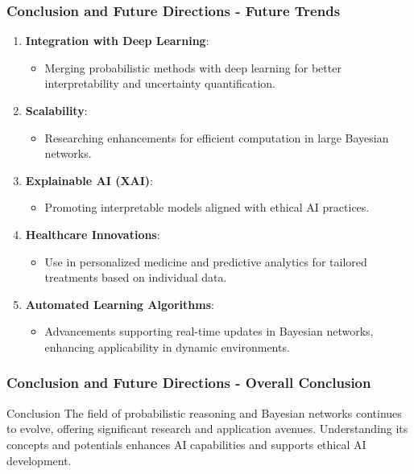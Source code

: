 \documentclass[aspectratio=169]{beamer}
\begin{document}
\begin{frame}[fragile]
  \frametitle{Conclusion and Future Directions - Future Trends}

  \begin{enumerate}
    \item \textbf{Integration with Deep Learning}:
    \begin{itemize}
      \item Merging probabilistic methods with deep learning for better interpretability and uncertainty quantification.
    \end{itemize}

    \item \textbf{Scalability}:
    \begin{itemize}
      \item Researching enhancements for efficient computation in large Bayesian networks.
    \end{itemize}

    \item \textbf{Explainable AI (XAI)}:
    \begin{itemize}
      \item Promoting interpretable models aligned with ethical AI practices.
    \end{itemize}

    \item \textbf{Healthcare Innovations}:
    \begin{itemize}
      \item Use in personalized medicine and predictive analytics for tailored treatments based on individual data.
    \end{itemize}

    \item \textbf{Automated Learning Algorithms}:
    \begin{itemize}
      \item Advancements supporting real-time updates in Bayesian networks, enhancing applicability in dynamic environments.
    \end{itemize}
  \end{enumerate}
\end{frame}

\begin{frame}[fragile]
  \frametitle{Conclusion and Future Directions - Overall Conclusion}

  \begin{block}{Conclusion}
    The field of probabilistic reasoning and Bayesian networks continues to evolve, offering significant research and application avenues. Understanding its concepts and potentials enhances AI capabilities and supports ethical AI development.
  \end{block}
\end{frame}
\end{document}
